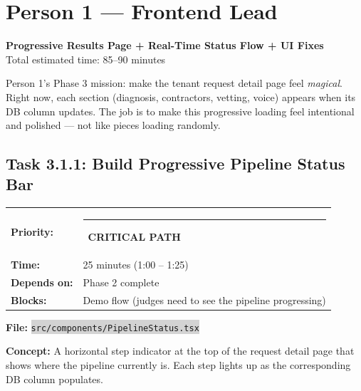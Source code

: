\documentclass[11pt, a4paper]{article}
\newcommand{\critical}{\textcolor{critred}{\rule{6pt}{6pt}}~\textcolor{critred}{\scriptsize\textbf{CRITICAL PATH}}}
\newcommand{\code}[1]{\texttt{\small\colorbox{lightgray}{#1}}}
\begin{document}
\newpage

\section{Person 1 --- Frontend Lead}
\begin{center}
\textcolor{medblue}{\large\textbf{Progressive Results Page + Real-Time Status Flow + UI Fixes}}\\[2pt]
\textcolor{textmuted}{\small Total estimated time: 85--90 minutes}
\end{center}

\vspace{0.5em}

Person 1's Phase 3 mission: make the tenant request detail page feel \textit{magical}. Right now, each section (diagnosis, contractors, vetting, voice) appears when its DB column updates. The job is to make this progressive loading feel intentional and polished --- not like pieces loading randomly.

\vspace{0.5em}

\subsection{Task 3.1.1: Build Progressive Pipeline Status Bar}

\begin{tabularx}{\textwidth}{lX}
\textbf{Priority:} & \critical \\
\textbf{Time:} & 25 minutes (1:00 -- 1:25) \\
\textbf{Depends on:} & Phase 2 complete \\
\textbf{Blocks:} & Demo flow (judges need to see the pipeline progressing) \\
\end{tabularx}

\vspace{0.3em}

\textbf{File:} \code{src/components/PipelineStatus.tsx}

\textbf{Concept:} A horizontal step indicator at the top of the request detail page that shows where the pipeline currently is. Each step lights up as the corresponding DB column populates.
\end{document}
